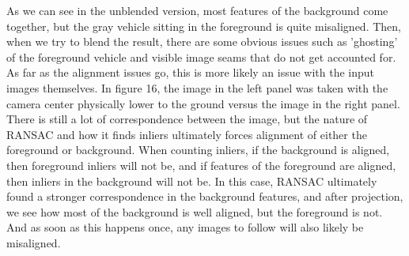 \documentclass[]{article}
\begin{document}
As we can see in the unblended version, most features of the background come together, but the gray vehicle sitting in the foreground is quite misaligned. Then, when we try to blend the result, there are some obvious issues such as 'ghosting' of the foreground vehicle and visible image seams that do not get accounted for. As far as the alignment issues go, this is more likely an issue with the input images themselves. In figure 16, the image in the left panel was taken with the camera center physically lower to the ground versus the image in the right panel. There is still a lot of correspondence between the image, but the nature of RANSAC and how it finds inliers ultimately forces alignment of either the foreground or background. When counting inliers, if the background is aligned, then foreground inliers will not be, and if features of the foreground are aligned, then inliers in the background will not be. In this case, RANSAC ultimately found a stronger correspondence in the background features, and after projection, we see how most of the background is well aligned, but the foreground is not. And as soon as this happens once, any images to follow will also likely be misaligned.
\end{document}
